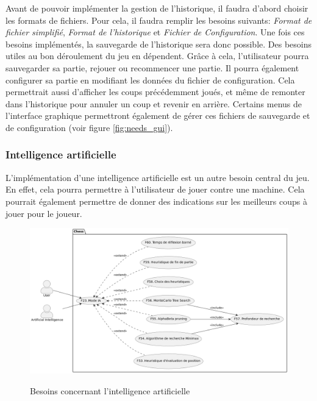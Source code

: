 \documentclass{article}
\begin{document}
Avant de pouvoir implémenter la gestion de l'historique, il faudra d'abord choisir les formats de fichiers.
Pour cela, il faudra remplir les besoins suivants: \textit{Format de fichier simplifié}, \textit{Format de l'historique} et \textit{Fichier de Configuration}.
Une fois ces besoins implémentés, la sauvegarde de l'historique sera donc possible.
Des besoins utiles au bon déroulement du jeu en dépendent. Grâce à cela, l'utilisateur pourra sauvegarder
sa partie, rejouer ou recommencer une partie. Il pourra également configurer sa partie en modifiant les données du fichier de configuration.
Cela permettrait aussi d'afficher les coups précédemment joués, et même de remonter dans l'historique pour annuler un coup et revenir en arrière.
Certains menus de l'interface graphique permettront également de gérer ces fichiers de sauvegarde et de configuration (voir figure \ref{fig:needs_gui}).

\subsubsection{Intelligence artificielle}
\label{IA}
L'implémentation d'une intelligence artificielle est un autre besoin central du jeu. En effet, cela pourra
permettre à l'utilisateur de jouer contre une machine. Cela pourrait également permettre de donner des
indications sur les meilleurs coups à jouer pour le joueur.

\begin{figure}[h]
    \caption{Besoins concernant l'intelligence artificielle}
    \centering
    \includegraphics[width=\textwidth,height=\textheight,keepaspectratio]{needs_ai}
    \label{fig:needs_ai}
\end{figure}
\end{document}
